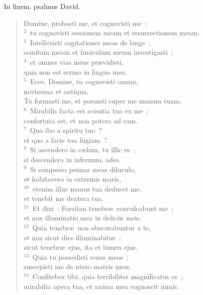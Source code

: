 \lettrine[lines=3,image=true,loversize=0.05,lraise=-0.03]{I}{}n finem, psalmus David. \begin{flushleft}\begin{verse}\vspace{6pt}Domine, probasti me, et cognovisti me~;\\
${}^{2}$~tu cognovisti sessionem meam et resurrectionem meam.\\
${}^{3}$~Intellexisti cogitationes meas de longe~;\\ semitam meam et funiculum meum investigasti~:\\
${}^{4}$~et omnes vias meas pr\ae vidisti,\\ quia non est sermo in lingua mea.\\
${}^{5}$~Ecce, Domine, tu cognovisti omnia,\\ novissima et antiqua.\\ Tu formasti me, et posuisti super me manum tuam.\\
${}^{6}$~Mirabilis facta est scientia tua ex me~;\\ confortata est, et non potero ad eam.\\
${}^{7}$~Quo ibo a spiritu tuo~?\\ et quo a facie tua fugiam~?\\
${}^{8}$~Si ascendero in c\ae lum, tu illic es~;\\ si descendero in infernum, ades.\\
${}^{9}$~Si sumpsero pennas meas diluculo,\\ et habitavero in extremis maris,\\
${}^{10}$~etenim illuc manus tua deducet me,\\ et tenebit me dextera tua.\\
${}^{11}$~Et dixi~: Forsitan tenebr\ae\ conculcabunt me~;\\ et nox illuminatio mea in deliciis meis.\\
${}^{12}$~Quia tenebr\ae\ non obscurabuntur a te,\\ et nox sicut dies illuminabitur~:\\ sicut tenebr\ae\ ejus, ita et lumen ejus.\\
${}^{13}$~Quia tu possedisti renes meos~;\\ suscepisti me de utero matris me\ae .\\
${}^{14}$~Confitebor tibi, quia terribiliter magnificatus es~;\\ mirabilia opera tua, et anima mea cognoscit nimis.\\

\end{verse}
\end{flushleft}
